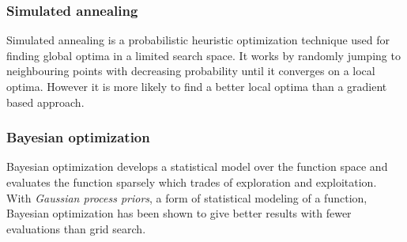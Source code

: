 \subsubsection{Simulated annealing}

Simulated annealing is a probabilistic heuristic optimization technique used for finding global optima in a limited search space. It works by randomly jumping to neighbouring points with decreasing probability until it converges on a local optima. However it is more likely to find a better local optima than a gradient based approach.


\subsubsection{Bayesian optimization}

Bayesian optimization develops a statistical model over the function space and evaluates the function sparsely which trades of exploration and exploitation.  With \textit{Gaussian process priors}, a form of statistical modeling of a function, Bayesian optimization has been shown to give better results with fewer evaluations than grid search. \citep{snoek2012practical}


